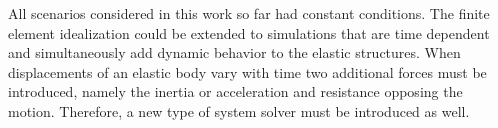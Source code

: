   All scenarios considered in this work so far had constant conditions. The finite element idealization could be extended to simulations that are time dependent and simultaneously add dynamic behavior to the elastic structures. When displacements of an elastic body vary with time two additional forces must be introduced, namely the inertia or acceleration and resistance opposing the motion. Therefore, a new type of system solver must be introduced as well.